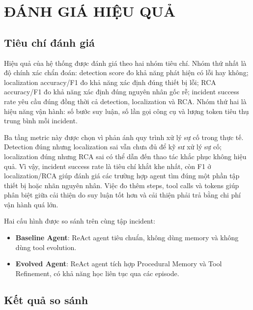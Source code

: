 \section{ĐÁNH GIÁ HIỆU QUẢ}

\subsection{Tiêu chí đánh giá}

Hiệu quả của hệ thống được đánh giá theo hai nhóm tiêu chí. Nhóm thứ nhất là độ chính xác chẩn đoán: detection score đo khả năng phát hiện có lỗi hay không; localization accuracy/F1 đo khả năng xác định đúng thiết bị lỗi; RCA accuracy/F1 đo khả năng xác định đúng nguyên nhân gốc rễ; incident success rate yêu cầu đúng đồng thời cả detection, localization và RCA. Nhóm thứ hai là hiệu năng vận hành: số bước suy luận, số lần gọi công cụ và lượng token tiêu thụ trung bình mỗi incident.

Ba tầng metric này được chọn vì phản ánh quy trình xử lý sự cố trong thực tế. Detection đúng nhưng localization sai vẫn chưa đủ để kỹ sư xử lý sự cố; localization đúng nhưng RCA sai có thể dẫn đến thao tác khắc phục không hiệu quả. Vì vậy, incident success rate là tiêu chí khắt khe nhất, còn F1 ở localization/RCA giúp đánh giá các trường hợp agent tìm đúng một phần tập thiết bị hoặc nhãn nguyên nhân. Việc đo thêm steps, tool calls và tokens giúp phân biệt giữa cải thiện do suy luận tốt hơn và cải thiện phải trả bằng chi phí vận hành quá lớn.

Hai cấu hình được so sánh trên cùng tập incident:
\begin{itemize}
  \item \textbf{Baseline Agent}: ReAct agent tiêu chuẩn, không dùng memory và không dùng tool evolution.
  \item \textbf{Evolved Agent}: ReAct agent tích hợp Procedural Memory và Tool Refinement, có khả năng học liên tục qua các episode.
\end{itemize}

\subsection{Kết quả so sánh}

